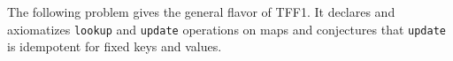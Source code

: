 
 The following problem gives the general flavor of TFF1.
It declares and axiomatizes {\tt lookup} and {\tt update} operations on
maps and conjectures that {\tt update} is idempotent for fixed keys and
values. %

